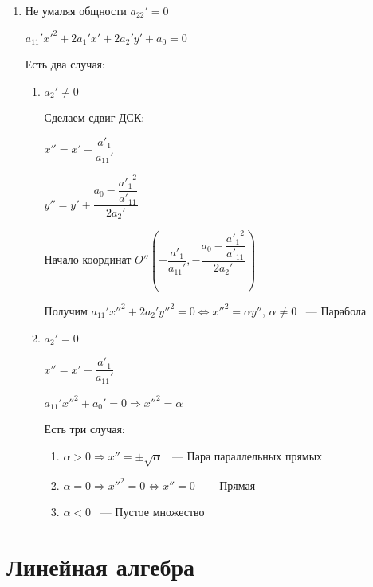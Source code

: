 \documentclass[twoside]{book}
\begin{document}
\begin{enumerate}
\begin{enumerate}
              \item Не умаляя общности \(a_{22}' = 0\)

                    \(a_{11}' x'^2 + 2 a_1' x' + 2 a_2' y' + a_0 = 0\)

                    Есть два случая:
                    \begin{enumerate}
                        \item \(a_2' \neq 0\)

                              Сделаем сдвиг ДСК:

                              \(x'' = x' + \dfrac{a'_1}{a_{11}'}\)

                              \(y'' = y' + \dfrac{a_0 - \dfrac{{a'_1}^2}{a'_{11}}}{2 a_2'}\)

                              Начало координат \(O''\left(-\dfrac{a'_1}{a_{11}'}, -\dfrac{a_0 - \dfrac{{a'_1}^2}{a'_{11}}}{2 a_2'}\right)\)

                              Получим \(a_{11}' x''^2 + 2 a_2' y''^2 = 0 \Leftrightarrow x''^2 = \alpha y''\), \(\alpha \neq 0\) ~--- Парабола
                        \item \(a_2' = 0\)

                              \(x'' = x' + \dfrac{a'_1}{a_{11}'}\)

                              \(a_{11}' x''^2 + a_0' = 0 \Rightarrow x''^2 = \alpha\)

                              Есть три случая:
                              \begin{enumerate}
                                  \item \(\alpha > 0 \Rightarrow x'' = \pm \sqrt \alpha\) ~--- Пара параллельных прямых

                                  \item \(\alpha = 0 \Rightarrow x''^2 = 0 \Leftrightarrow x'' = 0\) ~--- Прямая

                                  \item \(\alpha < 0\) ~--- Пустое множество
                              \end{enumerate}
                    \end{enumerate}
          \end{enumerate}
\end{enumerate}

\chapter{Линейная алгебра}
\end{document}

